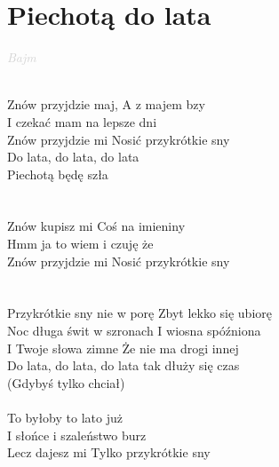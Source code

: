 \documentclass[a5paper, 10pt]{book}
\begin{document}
\section{Piechotą do lata}\textcolor{lightgray}{\textit{Bajm}}\\~\\
\begin{minipage}[t]{0.7\textwidth}
Znów przyjdzie maj, A z majem bzy\\
I czekać mam na lepsze dni\\
Znów przyjdzie mi Nosić przykrótkie sny\\

\hspace*{6mm}Do lata, do lata, do lata\\
\hspace*{6mm}Piechotą będę szła\\
\\
\\
Znów kupisz mi Coś na imieniny\\
Hmm ja to wiem i czuję że\\
Znów przyjdzie mi Nosić przykrótkie sny\\
\\
\\
\hspace*{2mm}Przykrótkie sny nie w porę Zbyt lekko się ubiorę\\
\hspace*{2mm}Noc długa świt w szronach I wiosna spóźniona\\
\hspace*{2mm}I Twoje słowa zimne Że nie ma drogi innej\\
\hspace*{2mm}Do lata, do lata, do lata tak dłuży się czas\\
\hspace*{2mm}(Gdybyś tylko chciał)\\
\\
To byłoby to lato już\\
I słońce i szaleństwo burz\\
Lecz dajesz mi Tylko przykrótkie sny\\
\end{minipage}
\end{document}
